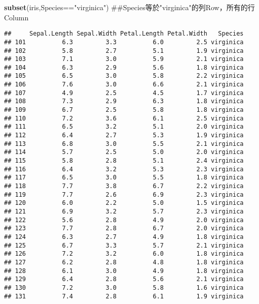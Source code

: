 \documentclass[]{book}
\newenvironment{Shaded}{\begin{snugshade}}{\end{snugshade}}
\newcommand{\KeywordTok}[1]{\textcolor[rgb]{0.13,0.29,0.53}{\textbf{{#1}}}}
\newcommand{\StringTok}[1]{\textcolor[rgb]{0.31,0.60,0.02}{{#1}}}
\newcommand{\NormalTok}[1]{{#1}}
\begin{document}
\begin{Shaded}
\begin{Highlighting}[]
\KeywordTok{subset}\NormalTok{(iris,Species==}\StringTok{"virginica"}\NormalTok{) ##Species等於"virginica"的列Row，所有的行Column}
\end{Highlighting}
\end{Shaded}

\begin{verbatim}
##     Sepal.Length Sepal.Width Petal.Length Petal.Width   Species
## 101          6.3         3.3          6.0         2.5 virginica
## 102          5.8         2.7          5.1         1.9 virginica
## 103          7.1         3.0          5.9         2.1 virginica
## 104          6.3         2.9          5.6         1.8 virginica
## 105          6.5         3.0          5.8         2.2 virginica
## 106          7.6         3.0          6.6         2.1 virginica
## 107          4.9         2.5          4.5         1.7 virginica
## 108          7.3         2.9          6.3         1.8 virginica
## 109          6.7         2.5          5.8         1.8 virginica
## 110          7.2         3.6          6.1         2.5 virginica
## 111          6.5         3.2          5.1         2.0 virginica
## 112          6.4         2.7          5.3         1.9 virginica
## 113          6.8         3.0          5.5         2.1 virginica
## 114          5.7         2.5          5.0         2.0 virginica
## 115          5.8         2.8          5.1         2.4 virginica
## 116          6.4         3.2          5.3         2.3 virginica
## 117          6.5         3.0          5.5         1.8 virginica
## 118          7.7         3.8          6.7         2.2 virginica
## 119          7.7         2.6          6.9         2.3 virginica
## 120          6.0         2.2          5.0         1.5 virginica
## 121          6.9         3.2          5.7         2.3 virginica
## 122          5.6         2.8          4.9         2.0 virginica
## 123          7.7         2.8          6.7         2.0 virginica
## 124          6.3         2.7          4.9         1.8 virginica
## 125          6.7         3.3          5.7         2.1 virginica
## 126          7.2         3.2          6.0         1.8 virginica
## 127          6.2         2.8          4.8         1.8 virginica
## 128          6.1         3.0          4.9         1.8 virginica
## 129          6.4         2.8          5.6         2.1 virginica
## 130          7.2         3.0          5.8         1.6 virginica
## 131          7.4         2.8          6.1         1.9 virginica

\end{verbatim}
\end{document}
